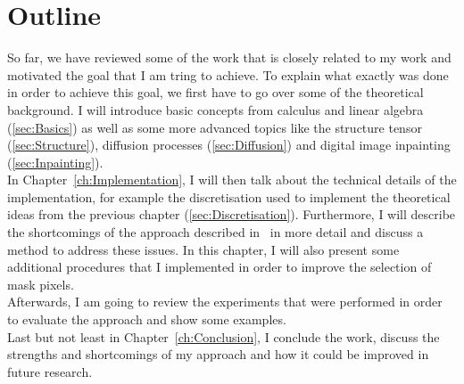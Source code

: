 \section{Outline}
So far, we have reviewed some of the work that is closely related to my work and 
motivated the goal that I am tring to achieve.
To explain what exactly was done in order to achieve this goal, we first have to go over some of the
theoretical background. I will introduce basic concepts from
calculus and linear algebra (\ref{sec:Basics}) as well as some more advanced topics
like the structure tensor (\ref{sec:Structure}), diffusion processes (\ref{sec:Diffusion}) and
digital image inpainting (\ref{sec:Inpainting}).\\
In Chapter~\ref{ch:Implementation}, I will then talk about the technical details of the  
implementation, for example the discretisation used to implement the theoretical ideas from 
the previous chapter (\ref{sec:Discretisation}). 
Furthermore, I will describe the shortcomings of the approach described in~\cite{zimmer07} in more
detail and discuss a method to address these issues. In this chapter, I will also present some
additional procedures that I implemented in order to improve the selection of mask pixels. \\
Afterwards, I am going to review the experiments that were performed in order to evaluate the
approach and show some examples.\\
Last but not least in Chapter~\ref{ch:Conclusion}, I conclude the work, discuss the strengths
and shortcomings of my approach and how it could be improved in future research.
